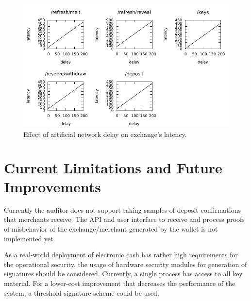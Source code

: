 \begin{figure}
  \includegraphics[width=\textwidth]{plots/latencies.pdf}
  \caption[Effect of artificial network delay on exchange's latency.]{Effect of artificial network delay on exchange's latency.}
  \label{fig:latencies}
\end{figure}



\section{Current Limitations and Future Improvements}\label{sec:implementation-improvements}
Currently the auditor does not support taking samples of deposit confirmations that
merchants receive.  The API and user interface to receive and process proofs
of misbehavior of the exchange/merchant generated by the wallet is not implemented yet.

As a real-world deployment of electronic cash has rather high requirements for
the operational security, the usage of hardware security modules for generation
of signatures should be considered.  Currently, a single process has access to
all key material.  For a lower-cost improvement that decreases the performance
of the system, a threshold signature scheme could be used.

